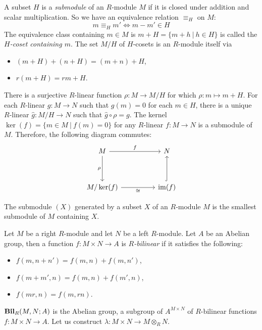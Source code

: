 \documentclass[8pt]{article}
\theoremstyle{definition}
\theoremstyle{definition}
\theoremstyle{definition}
\theoremstyle{definition}
\theoremstyle{definition}
\theoremstyle{definition}
\theoremstyle{definition}
\theoremstyle{definition}
\theoremstyle{definition}
\theoremstyle{definition}
\theoremstyle{definition}
\theoremstyle{definition}
\theoremstyle{definition}
\theoremstyle{definition}
\theoremstyle{question}
\begin{document}
A subset $H$ is a \emph{submodule} of an $R$-module $M$ if it is closed under addition and scalar multiplication.
So we have an equivalence relation $\equiv_H$ on $M$:
\[
m \equiv_H m' \Leftrightarrow m - m' \in H
\]
The equivalence class containing $m \in M$ is $m + H = \{ m + h \: | \: h \in H \}$
is called the \emph{$H$-coset containing $m$}. The set $M / H$ of $H$-cosets is an $R$-module itself via
\begin{itemize}
  \item $(m + H) + (n + H) = (m + n) + H$,
  \item $r (m + H) = rm + H$.
\end{itemize}
There is a surjective $R$-linear function $\rho : M \to M / H$ for which $\rho : m \mapsto m + H$.
For each $R$-linear $g : M \to N$ such that $g(m) = 0$ for each $m \in H$, there is a unique $R$-linear
$\hat{g} : M / H \to N$ such that $\hat{g} \circ \rho = g$. The kernel $\operatorname{ker}(f) = \{ m \in M \: | \: f(m) = 0\}$
for any $R$-linear $f : M \to N$ is a submodule of $M$. Therefore, the following diagram commutes:
\[
\begin{tikzcd}
  M \ar[rr, "f"] \ar[dd, "\rho"'] && N \\ 
  \\
  M / \operatorname{ker}(f) \ar[rr, "\cong"'] && \operatorname{im}(f) \ar[uu, hook, ""]
\end{tikzcd}
\]

The submodule $(X)$ generated by a subset $X$ of an $R$-module $M$ is the smallest submodule of $M$
containing $X$.

Let $M$ be a right $R$-module and let $N$ be a left $R$-module. Let $A$ be an Abelian group, 
then a function $f : M \times N \to A$ is \emph{$R$-bilinear} if it satisfies the following:
\begin{itemize}
  \item $f(m, n + n') = f(m, n) + f(m, n')$,
  \item $f(m + m', n) = f(m, n) + f(m', n)$,
  \item $f(m r, n) = f(m, r n)$.
\end{itemize}

${\bf Bil}_R(M, N; A)$ is the Abelian group, a subgroup of $A^{M \times N}$ of $R$-bilinear functions
$f : M \times N \to A$. Let us construct $\lambda : M \times N \to M \otimes_R N$.
\end{document}
